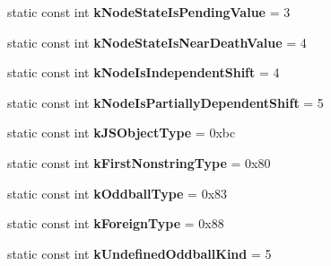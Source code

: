 \begin{DoxyCompactItemize}
\item 
\hypertarget{classv8_1_1internal_1_1_internals_a843b53b17257ecd957eade0d9f21c5ab}{}static const int {\bfseries k\+Node\+State\+Is\+Pending\+Value} = 3\label{classv8_1_1internal_1_1_internals_a843b53b17257ecd957eade0d9f21c5ab}

\item 
\hypertarget{classv8_1_1internal_1_1_internals_a18f3e757639b07bdabb8cda7dd4a8bdb}{}static const int {\bfseries k\+Node\+State\+Is\+Near\+Death\+Value} = 4\label{classv8_1_1internal_1_1_internals_a18f3e757639b07bdabb8cda7dd4a8bdb}

\item 
\hypertarget{classv8_1_1internal_1_1_internals_a228b2b58c77c17bc512b92d9e3aea48b}{}static const int {\bfseries k\+Node\+Is\+Independent\+Shift} = 4\label{classv8_1_1internal_1_1_internals_a228b2b58c77c17bc512b92d9e3aea48b}

\item 
\hypertarget{classv8_1_1internal_1_1_internals_aeda4d6fc1bd10ca57398597f3bb496f3}{}static const int {\bfseries k\+Node\+Is\+Partially\+Dependent\+Shift} = 5\label{classv8_1_1internal_1_1_internals_aeda4d6fc1bd10ca57398597f3bb496f3}

\item 
\hypertarget{classv8_1_1internal_1_1_internals_a56b7062df5d9a7df491137d4c3341bcc}{}static const int {\bfseries k\+J\+S\+Object\+Type} = 0xbc\label{classv8_1_1internal_1_1_internals_a56b7062df5d9a7df491137d4c3341bcc}

\item 
\hypertarget{classv8_1_1internal_1_1_internals_a6f4a54927b01a11f444fb2f00b47ca1d}{}static const int {\bfseries k\+First\+Nonstring\+Type} = 0x80\label{classv8_1_1internal_1_1_internals_a6f4a54927b01a11f444fb2f00b47ca1d}

\item 
\hypertarget{classv8_1_1internal_1_1_internals_a13081e936f8c96472f1b1496c70d4dc1}{}static const int {\bfseries k\+Oddball\+Type} = 0x83\label{classv8_1_1internal_1_1_internals_a13081e936f8c96472f1b1496c70d4dc1}

\item 
\hypertarget{classv8_1_1internal_1_1_internals_a263195f36f9e8ee64af70dc267a85d55}{}static const int {\bfseries k\+Foreign\+Type} = 0x88\label{classv8_1_1internal_1_1_internals_a263195f36f9e8ee64af70dc267a85d55}

\item 
\hypertarget{classv8_1_1internal_1_1_internals_a39072b9e0ffea4031f4a1c514208b20d}{}static const int {\bfseries k\+Undefined\+Oddball\+Kind} = 5\label{classv8_1_1internal_1_1_internals_a39072b9e0ffea4031f4a1c514208b20d}


\end{DoxyCompactItemize}
